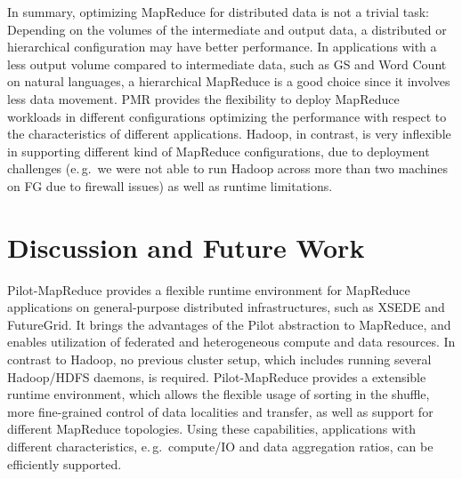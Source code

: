\documentclass{sig-alternate}
\newcommand{\alnote}[1]{ {\textcolor{blue} { ***andreL: #1 }}}
\newcommand{\alnote}[1]{}
\newcommand{\upp}{\vspace*{-0.5em}}
\newcommand{\pilotmapreduce}{Pilot-MapReduce\xspace}
\begin{document}
In summary, optimizing MapReduce for distributed data is not a trivial
task: 
Depending on the volumes of the intermediate and output data, a distributed or
hierarchical configuration may have better performance. In applications with a
less output volume compared to intermediate data, such as GS and Word Count on
natural languages, a hierarchical MapReduce is a good choice since it involves
less data movement. PMR provides the flexibility to deploy MapReduce workloads
in different configurations optimizing the performance with respect to the
characteristics of different applications. Hadoop, in contrast, is very
inflexible in supporting different kind of MapReduce configurations, due to
deployment challenges (e.\,g.\ we were not able to run Hadoop across more than
two machines on FG due to firewall issues) as well as runtime limitations.

\upp\upp
\section{Discussion and Future Work}
\label{sec-conclusion}

\pilotmapreduce provides a flexible runtime environment for MapReduce
applications on general-purpose distributed infrastructures, such as XSEDE and
FutureGrid. It brings the advantages of the Pilot abstraction to MapReduce, and
enables utilization of federated and heterogeneous compute and data resources.
In contrast to Hadoop, no previous cluster setup, which includes running several
Hadoop/HDFS daemons, is required. Pilot-MapReduce provides a extensible runtime
environment, which allows the flexible usage of sorting in the shuffle, more
fine-grained control of data localities and transfer, as well as support for
different MapReduce topologies. Using these capabilities, applications with
different characteristics, e.\,g.\ compute/IO and data aggregation ratios, can
be efficiently supported. 

\end{document}
